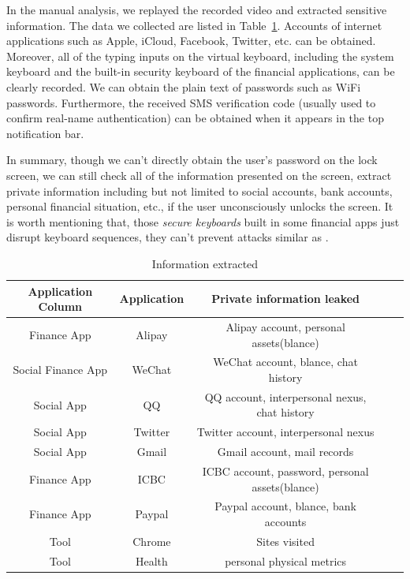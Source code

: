 In the manual analysis, we replayed the recorded video and extracted sensitive information.
The data we collected are listed in Table~\ref{table:information_extracted}.
Accounts of internet applications such as Apple, iCloud, Facebook, Twitter, etc. can be obtained.
Moreover, all of the typing inputs on the virtual keyboard, including the system keyboard and the built-in security keyboard of the financial applications, can be clearly recorded.
We can obtain the plain text of passwords such as WiFi passwords.
Furthermore, the received SMS verification code (usually used to confirm real-name authentication) can be obtained when it appears in the top notification bar.

In summary, though we can't directly obtain the user's password on the lock screen, we can still check all of the information presented on the screen, extract private information including but not limited to social accounts, bank accounts, personal financial situation, etc., if the user unconsciously unlocks the screen.
It is worth mentioning that, those \textit{secure keyboards} built in some financial apps just disrupt keyboard sequences, they can't prevent attacks similar as \tool.

\begin{table}[t]
	\centering
	\begin{tabular}{|c|c|c|c|c|}
		\hline
		Application Column  & Application & Private information leaked                       \\
		\hline
		Finance App         & Alipay      & Alipay account, personal assets(blance)          \\
		\hline
		Social  Finance App & WeChat      & WeChat account, blance, chat history             \\
		\hline
		Social App          & QQ          & QQ account, interpersonal nexus, chat history    \\
		\hline
		Social App          & Twitter     & Twitter account, interpersonal nexus             \\
		\hline
		Social App          & Gmail       & Gmail account, mail records                      \\
		\hline
		Finance App         & ICBC        & ICBC account, password, personal assets(blance)  \\
		\hline
		Finance App         & Paypal      & Paypal account, blance, bank accounts            \\
		\hline
		Tool                & Chrome      & Sites visited                                    \\
		\hline
		Tool                & Health      & personal physical metrics      					 \\
		\hline
	\end{tabular}
	\linebreak
	\caption{Information extracted}
	\label{table:information_extracted}
\end{table}
